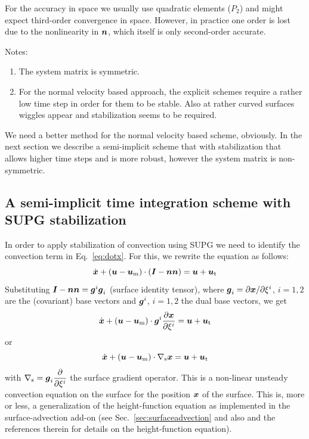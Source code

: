 For the accuracy in space we usually use quadratic elements ($P_2$) and might
expect third-order convergence in space. However, in practice one order
is lost due to the nonlinearity in $\boldsymbol{n}$, which itself is only
second-order accurate.

Notes:
\begin{enumerate}
  \item The system matrix is symmetric.
  \item For the normal velocity based approach, the explicit schemes require
        a rather low time step in order for them to be stable. 
        Also at rather curved surfaces wiggles appear and stabilization seems
        to be required.
\end{enumerate}

We need a better method for the normal velocity based scheme, obviously.
In the next section we describe a semi-implicit scheme that with 
stabilization that allows higher time steps and is more robust, however the
system matrix is non-symmetric.

\subsection{A semi-implicit time integration scheme with SUPG stabilization}
\label{sec:interface_tracking_SUPG}

In order to apply stabilization of convection using SUPG we need to identify
the convection term in Eq.~\eqref{eq:dotx}. For this, we rewrite the equation
as follows:
\[
   \dot{\boldsymbol{x}} + (\boldsymbol{u} - \boldsymbol{u}_\text{m})\cdot(\boldsymbol{I} -\boldsymbol{n}\boldsymbol{n}) =
          \boldsymbol{u} + \boldsymbol{u}_\text{t} 
\]
Substituting $\boldsymbol{I} -\boldsymbol{n}\boldsymbol{n}=\boldsymbol{g}^i\boldsymbol{g}_i$ (surface
identity tensor), where $\boldsymbol{g}_i=\partial \boldsymbol{x}/\partial \xi^i$, $i=1,2$ are the 
(covariant) base vectors and $\boldsymbol{g}^i$, $i=1,2$ the dual base vectors, we get
\[
   \dot{\boldsymbol{x}} + (\boldsymbol{u} - \boldsymbol{u}_\text{m})\cdot\boldsymbol{g}^i\dfrac{\partial \boldsymbol{x}}{\partial \xi^i}
        = \boldsymbol{u} + \boldsymbol{u}_\text{t} 
\]
or 
\begin{equation}
   \dot{\boldsymbol{x}} + (\boldsymbol{u} - \boldsymbol{u}_\text{m})\cdot\nabla_\text{s}\boldsymbol{x}
        = \boldsymbol{u} + \boldsymbol{u}_\text{t} 
   \label{eq:generalized_height}
\end{equation}
with $\nabla_\text{s}=\boldsymbol{g}_i\dfrac{\partial }{\partial \xi^i}$ the surface gradient operator.
This is a non-linear unsteady convection equation on the surface for the
position $\boldsymbol{x}$ of the surface. This is, more or less, a generalization of the
height-function equation as implemented in the surface-advection add-on 
(see Sec.~\ref{sec:surfaceadvection} and also \cite{Choi11c,Choi11b} and the
references therein for details on the height-function equation). 

